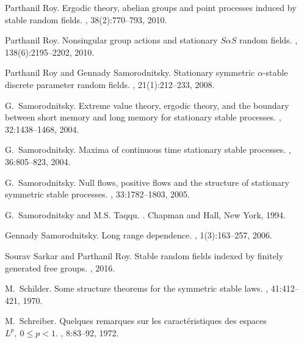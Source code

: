 \documentclass[12pt]{amsart}
\begin{document}
\begin{thebibliography}{10}
	Parthanil Roy.
	\newblock Ergodic theory, abelian groups and point processes induced by stable
	random fields.
	, 38(2):770--793, 2010.
	
	Parthanil Roy.
	\newblock Nonsingular group actions and stationary {$S\alpha S$} random fields.
	,
	138(6):2195--2202, 2010.
	
	Parthanil Roy and Gennady Samorodnitsky.
	\newblock Stationary symmetric {$\alpha$}-stable discrete parameter random
	fields.
	, 21(1):212--233, 2008.
	
	G.~Samorodnitsky.
	\newblock Extreme value theory, ergodic theory, and the boundary between short
	memory and long memory for stationary stable processes.
	, 32:1438--1468, 2004.
	
	G.~Samorodnitsky.
	\newblock Maxima of continuous time stationary stable processes.
	, 36:805--823, 2004.
	
	G.~Samorodnitsky.
	\newblock Null flows, positive flows and the structure of stationary symmetric
	stable processes.
	, 33:1782--1803, 2005.
	
	G.~Samorodnitsky and M.S. Taqqu.
	.
	\newblock Chapman and Hall, New York, 1994.
	
	Gennady Samorodnitsky.
	\newblock Long range dependence.
	, 1(3):163--257, 2006.
	
	Sourav Sarkar and Parthanil Roy.
	\newblock Stable random fields indexed by finitely generated free groups.
	, 2016.
	
	M.~Schilder.
	\newblock Some structure theorems for the symmetric stable laws.
	, 41:412--421, 1970.
	
	M.~Schreiber.
	\newblock Quelques remarques sur les caract\'eristiques des espaces ${L}^p,\
	0\leq p <1$.
	, 8:83--92, 1972.
	

\end{thebibliography}
\end{document}
